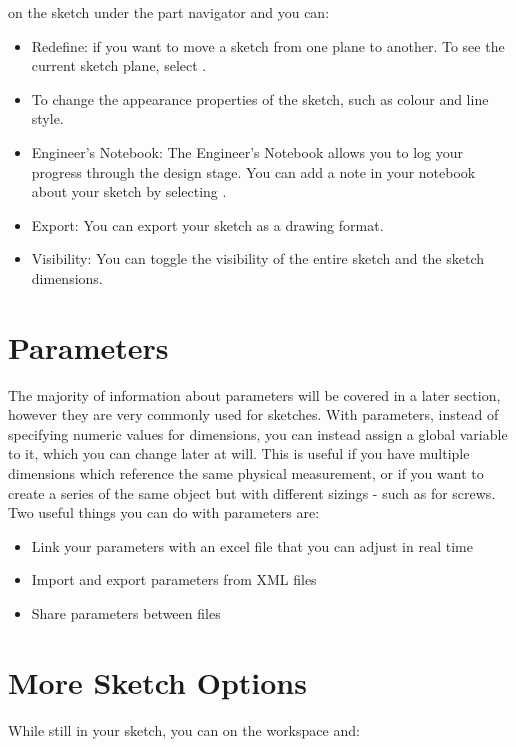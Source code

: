 \begin{enumerate}
 on the sketch under the part navigator and you can:
\begin{itemize}
\item Redefine: if you want to move a sketch from one plane to another. To see the current sketch plane, select .
\item To change the appearance properties of the sketch, such as colour and line style.
\item Engineer's Notebook: The Engineer's Notebook allows you to log your progress through the design stage. You can add a note in your notebook about your sketch by selecting .
\item Export: You can export your sketch as a drawing format.
\item Visibility: You can toggle the visibility of the entire sketch and the sketch dimensions.
\end{itemize}

\section{Parameters}

The majority of information about parameters will be covered in a later section, however they are very commonly used for sketches. With parameters, instead of specifying numeric values for dimensions, you can instead assign a global variable to it, which you can change later at will. This is useful if you have multiple dimensions which reference the same physical measurement, or if you want to create a series of the same object but with different sizings - such as for screws. Two useful things you can do with parameters are:

\begin{itemize}
\item Link your parameters with an excel file that you can adjust in real time
\item Import and export parameters from XML files
\item Share parameters between files
\end{itemize}


\section{More Sketch Options}

\mediumdifficulty
While still in your sketch, you can  on the workspace and:


\end{enumerate}
